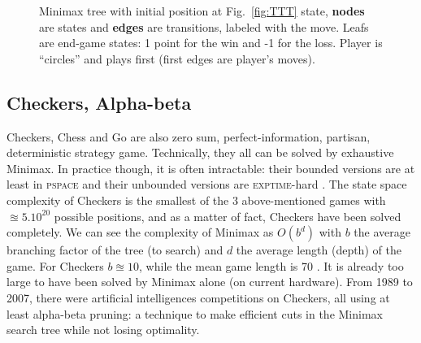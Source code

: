 \begin{figure}
\begin{center}
\end{center}
\caption{Minimax tree with initial position at Fig.~\ref{fig:TTT} state, \textbf{nodes} are states and \textbf{edges} are transitions, labeled with the move. Leafs are end-game states: 1 point for the win and -1 for the loss. Player is ``circles'' and plays first (first edges are player's moves).}
\label{fig:minimaxTTT}
\end{figure}
\subsection{Checkers, Alpha-beta}
Checkers, Chess and Go are also zero sum, perfect-information, partisan, deterministic strategy game. Technically, they all can be solved by exhaustive Minimax. In practice though, it is often intractable: their bounded versions are at least in \textsc{pspace} and their unbounded versions are \textsc{exptime}-hard \citep{GPC}. The state space complexity of Checkers is the smallest of the 3 above-mentioned games with $\approxeq 5.10^20$ possible positions, and as a matter of fact, Checkers have been solved completely\citep{SchaefferBBKMLLS07}. We can see the complexity of Minimax as $O(b^d)$ with $b$ the average branching factor of the tree (to search) and $d$ the average length (depth) of the game. For Checkers $b \approxeq 10$, while the mean game length is 70 \citep{allis1994}. It is already too large to have been solved by Minimax alone (on current hardware). From 1989 to 2007, there were artificial intelligences competitions on Checkers, all using at least alpha-beta pruning: a technique to make efficient cuts in the Minimax search tree while not losing optimality.

